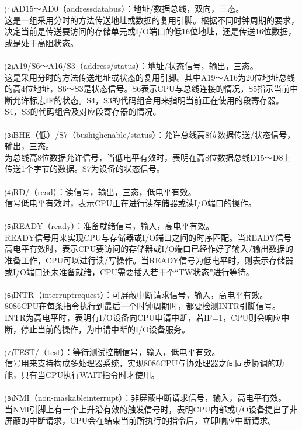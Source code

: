 \documentclass[12pt]{article}
\begin{document}
⑴AD15～AD0（addressdatabus）：地址/数据总线，双向，三态。\\
这是一组采用分时的方法传送地址或数据的复用引脚。根据不同时钟周期的要求，决定当前是传送要访问的存储单元或I/O端口的低16位地址，还是传送16位数据，或是处于高阻状态。\\\\
⑵A19/S6～A16/S3（address/status）：地址/状态信号，输出，三态。\\
这是采用分时的方法传送地址或状态的复用引脚。其中A19～A16为20位地址总线的高4位地址，S6～S3是状态信号。S6表示CPU与总线连接的情况，S5指示当前中断允许标志IF的状态。S4，S3的代码组合用来指明当前正在使用的段寄存器。S4，S3的代码组合及对应段寄存器的情况。\\\\
⑶BHE（低）/S7（bushighenable/status）：允许总线高8位数据传送/状态信号，输出，三态。\\
为总线高8位数据允许信号，当低电平有效时，表明在高8位数据总线D15～D8上传送1个字节的数据。S7为设备的状态信号。\\\\
⑷RD/（read）：读信号，输出，三态，低电平有效。\\
信号低电平有效时，表示CPU正在进行读存储器或读I/O端口的操作。\\\\
⑸READY（ready）：准备就绪信号，输入，高电平有效。\\
READY信号用来实现CPU与存储器或I/O端口之间的时序匹配。当READY信号高电平有效时，表示CPU要访问的存储器或I/O端口已经作好了输入/输出数据的准备工作，CPU可以进行读/写操作。当READY信号为低电平时，则表示存储器或I/O端口还未准备就绪，CPU需要插入若干个“TW状态”进行等待。\\\\
⑹INTR（interruptrequest）：可屏蔽中断请求信号，输入，高电平有效。\\
8086CPU在每条指令执行到最后一个时钟周期时，都要检测INTR引脚信号。INTR为高电平时，表明有I/O设备向CPU申请中断，若IF=1，CPU则会响应中断，停止当前的操作，为申请中断的I/O设备服务。\\\\
⑺TEST/（test）：等待测试控制信号，输入，低电平有效。\\
信号用来支持构成多处理器系统，实现8086CPU与协处理器之间同步协调的功能，只有当CPU执行WAIT指令时才使用。\\\\
⑻NMI（non-maskableinterrupt）：非屏蔽中断请求信号，输入，高电平有效。\\
当NMI引脚上有一个上升沿有效的触发信号时，表明CPU内部或I/O设备提出了非屏蔽的中断请求，CPU会在结束当前所执行的指令后，立即响应中断请求。\\\\
\end{document}
